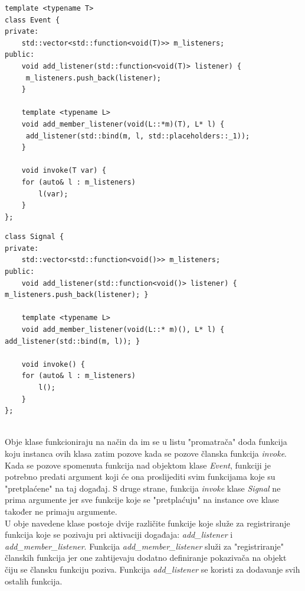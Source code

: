 \documentclass[times, utf8, diplomski]{fer}
\begin{document}
\begin{lstlisting}[caption={Klasa \textit{Event}},captionpos=b]
template <typename T>
class Event {
private:
	std::vector<std::function<void(T)>> m_listeners;
public:
	void add_listener(std::function<void(T)> listener) {
	 m_listeners.push_back(listener); 
	}
	
	template <typename L>
	void add_member_listener(void(L::*m)(T), L* l) {
	 add_listener(std::bind(m, l, std::placeholders::_1)); 
	}
	
	void invoke(T var) {
	for (auto& l : m_listeners)
		l(var);
	}
};
\end{lstlisting}

\begin{lstlisting}[caption={Klasa \textit{Signal}},captionpos=b]
class Signal {
private:
	std::vector<std::function<void()>> m_listeners;
public:
	void add_listener(std::function<void()> listener) { m_listeners.push_back(listener); }

	template <typename L>
	void add_member_listener(void(L::* m)(), L* l) { add_listener(std::bind(m, l)); }

	void invoke() {
	for (auto& l : m_listeners)
		l();
	}
};
\end{lstlisting}
\
\\

Obje klase funkcioniraju na način da im se u listu "promatrača" doda funkcija koju instanca ovih klasa zatim pozove kada se pozove članska funkcija \textit{invoke}. Kada se pozove spomenuta funkcija nad objektom klase \textit{Event}, funkciji je potrebno predati argument koji će ona proslijediti svim funkcijama koje su "pretplaćene" na taj događaj. S druge strane, funkcija \textit{invoke} klase \textit{Signal} ne prima argumente jer sve funkcije koje se "pretplaćuju" na instance ove klase također ne primaju argumente.\\

U obje navedene klase postoje dvije različite funkcije koje služe za registriranje funkcija koje se pozivaju pri aktivaciji događaja: \textit{add\_listener} i \textit{add\_member\_listener}. Funkcija \textit{add\_member\_listener} služi za "registriranje" članskih funkcija jer one zahtijevaju dodatno definiranje pokazivača na objekt čiju se člansku funkciju poziva. Funkcija \textit{add\_listener} se koristi za dodavanje svih ostalih funkcija.
\end{document}
